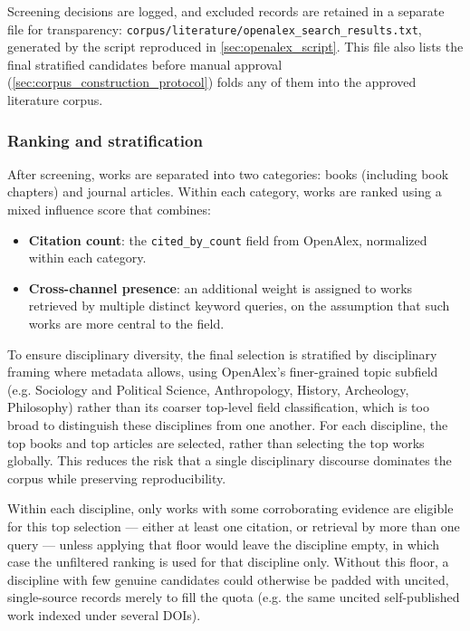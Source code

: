 Screening decisions are logged, and excluded records are retained in a separate file for transparency: \texttt{corpus/literature/openalex\_search\_results.txt}, generated by the script reproduced in \ref{sec:openalex_script}. This file also lists the final stratified candidates before manual approval (\ref{sec:corpus_construction_protocol}) folds any of them into the approved literature corpus.

\subsubsection{Ranking and stratification}
After screening, works are separated into two categories: books (including book chapters) and journal articles. Within each category, works are ranked using a mixed influence score that combines:

\begin{itemize}
	\item \textbf{Citation count}: the \verb+cited_by_count+ field from OpenAlex, normalized within each category.
	\item \textbf{Cross-channel presence}: an additional weight is assigned to works retrieved by multiple distinct keyword queries, on the assumption that such works are more central to the field.
\end{itemize}

To ensure disciplinary diversity, the final selection is stratified by disciplinary framing where metadata allows, using OpenAlex's finer-grained topic subfield (e.g. Sociology and Political Science, Anthropology, History, Archeology, Philosophy) rather than its coarser top-level field classification, which is too broad to distinguish these disciplines from one another. For each discipline, the top books and top articles are selected, rather than selecting the top works globally. This reduces the risk that a single disciplinary discourse dominates the corpus while preserving reproducibility.

Within each discipline, only works with some corroborating evidence are eligible for this top selection — either at least one citation, or retrieval by more than one query — unless applying that floor would leave the discipline empty, in which case the unfiltered ranking is used for that discipline only. Without this floor, a discipline with few genuine candidates could otherwise be padded with uncited, single-source records merely to fill the quota (e.g. the same uncited self-published work indexed under several DOIs).

